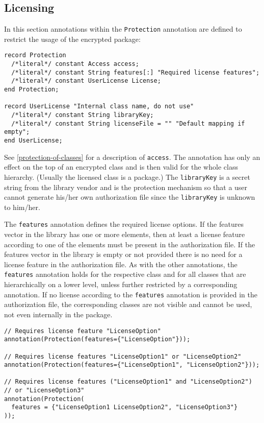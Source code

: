 \subsection{Licensing}\label{licensing}

In this section annotations within the \lstinline!Protection! annotation are defined to restrict the usage of the encrypted package:
\begin{lstlisting}[language=modelica]
record Protection
  /*literal*/ constant Access access;
  /*literal*/ constant String features[:] "Required license features";
  /*literal*/ constant UserLicense License;
end Protection;

record UserLicense "Internal class name, do not use"
  /*literal*/ constant String libraryKey;
  /*literal*/ constant String licenseFile = "" "Default mapping if empty";
end UserLicense;
\end{lstlisting}
See \cref{protection-of-classes} for a description of \lstinline!access!.
The  annotation has only an effect on the top of an encrypted class and is then valid for the whole class hierarchy.
(Usually the licensed class is a package.)
The \lstinline!libraryKey! is a secret string from the library vendor and is the protection mechanism so that a user cannot generate his/her own authorization file since the \lstinline!libraryKey! is unknown to him/her.

The \lstinline!features! annotation defines the required license options.
If the features vector in the library has one or more elements, then at least a license feature according to one of the elements must be present in the authorization file.
If the features vector in the library is empty or not provided there is no need for a license feature in the authorization file.
As with the other annotations, the \lstinline!features! annotation holds for the respective class and for all classes that are hierarchically on a lower level, unless further restricted by a corresponding annotation.
If no license according to the \lstinline!features! annotation is provided in the authorization file, the corresponding classes are not visible and cannot be used, not even internally in the package.

\begin{example}
\begin{lstlisting}[language=modelica]
// Requires license feature "LicenseOption"
annotation(Protection(features={"LicenseOption"}));

// Requires license features "LicenseOption1" or "LicenseOption2"
annotation(Protection(features={"LicenseOption1", "LicenseOption2"}));

// Requires license features ("LicenseOption1" and "LicenseOption2")
// or "LicenseOption3"
annotation(Protection(
  features = {"LicenseOption1 LicenseOption2", "LicenseOption3"}
));
\end{lstlisting}
\end{example}

